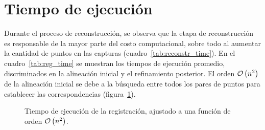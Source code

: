 
	\section{Tiempo de ejecución}

		Durante el proceso de reconstrucción, se observa que la etapa de reconstrucción
		es responsable de la mayor parte del costo computacional, sobre todo al aumentar
		la cantidad de puntos en las capturas (cuadro~\ref{tab:reconstr_time}).
		En el cuadro~\ref{tab:reg_time} se muestran
		los tiempos de ejecución promedio, discriminados en la alineación
		inicial y el refinamiento posterior.
		El orden $\mathcal{O}\left(n^2\right)$ de la alineación inicial se debe a la búsqueda
		entre todos los pares de puntos para establecer las correspondencias (figura~\ref{fig:registration_order}).
		

		

		\begin{figure}
			\centering
			
			\caption{\label{fig:registration_order}Tiempo de ejecución de la registración, ajustado a una función de orden $\mathcal{O}\left(n^2\right)$.}
		\end{figure}
